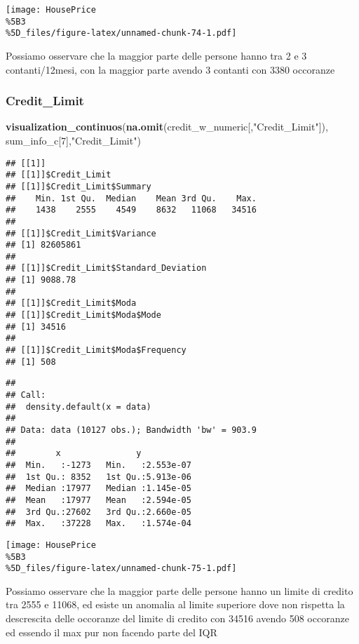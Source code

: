 \documentclass[
]{article}
\newenvironment{Shaded}{\begin{snugshade}}{\end{snugshade}}
\newcommand{\DecValTok}[1]{\textcolor[rgb]{0.00,0.00,0.81}{#1}}
\newcommand{\FunctionTok}[1]{\textcolor[rgb]{0.13,0.29,0.53}{\textbf{#1}}}
\newcommand{\NormalTok}[1]{#1}
\newcommand{\StringTok}[1]{\textcolor[rgb]{0.31,0.60,0.02}{#1}}
\begin{document}
\texttt{[image: HousePrice\\\%5B3\\\%5D\_files/figure-latex/unnamed-chunk-74-1.pdf]}

Possiamo osservare che la maggior parte delle persone hanno tra 2 e 3
contanti/12mesi, con la maggior parte avendo 3 contanti con 3380
occoranze

\subsubsection{Credit\_Limit}\label{credit_limit}

\begin{Shaded}
\begin{Highlighting}[]
\FunctionTok{visualization\_continuos}\NormalTok{(}\FunctionTok{na.omit}\NormalTok{(credit\_w\_numeric[,}\StringTok{"Credit\_Limit"}\NormalTok{]), sum\_info\_c[}\DecValTok{7}\NormalTok{],}\StringTok{"Credit\_Limit"}\NormalTok{)}
\end{Highlighting}
\end{Shaded}

\begin{verbatim}
## [[1]]
## [[1]]$Credit_Limit
## [[1]]$Credit_Limit$Summary
##    Min. 1st Qu.  Median    Mean 3rd Qu.    Max. 
##    1438    2555    4549    8632   11068   34516 
## 
## [[1]]$Credit_Limit$Variance
## [1] 82605861
## 
## [[1]]$Credit_Limit$Standard_Deviation
## [1] 9088.78
## 
## [[1]]$Credit_Limit$Moda
## [[1]]$Credit_Limit$Moda$Mode
## [1] 34516
## 
## [[1]]$Credit_Limit$Moda$Frequency
## [1] 508
\end{verbatim}

\begin{verbatim}
## 
## Call:
##  density.default(x = data)
## 
## Data: data (10127 obs.); Bandwidth 'bw' = 903.9
## 
##        x               y            
##  Min.   :-1273   Min.   :2.553e-07  
##  1st Qu.: 8352   1st Qu.:5.913e-06  
##  Median :17977   Median :1.145e-05  
##  Mean   :17977   Mean   :2.594e-05  
##  3rd Qu.:27602   3rd Qu.:2.660e-05  
##  Max.   :37228   Max.   :1.574e-04
\end{verbatim}

\texttt{[image: HousePrice\\\%5B3\\\%5D\_files/figure-latex/unnamed-chunk-75-1.pdf]}

Possiamo osservare che la maggior parte delle persone hanno un limite di
credito tra 2555 e 11068, ed esiste un anomalia al limite superiore dove
non rispetta la descrescita delle occoranze del limite di credito con
34516 avendo 508 occoranze ed essendo il max pur non facendo parte del
IQR
\end{document}
